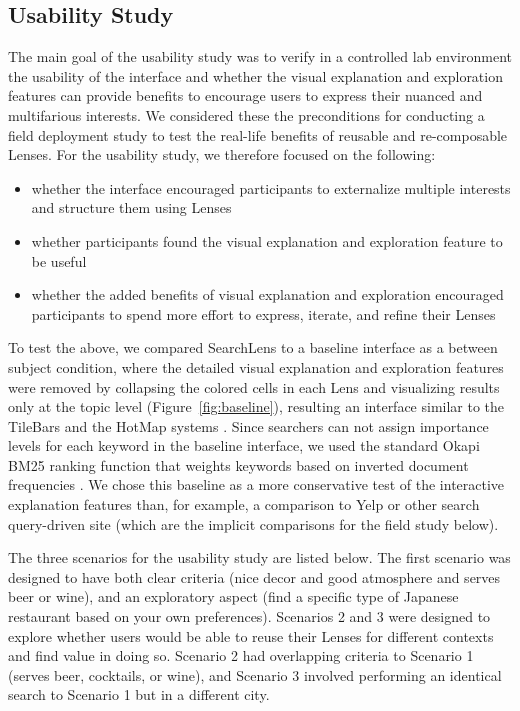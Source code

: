 \documentclass{sigchi}
\begin{document}
\subsection{Usability Study}

The main goal of the usability study was to verify in a controlled lab environment the usability of the interface and whether the visual explanation and exploration features can provide benefits to encourage users to express their nuanced and multifarious interests. We considered these the preconditions for conducting a field deployment study to test the real-life benefits of reusable and re-composable Lenses. For the usability study, we therefore focused on the following:

\begin{itemize}

    \item whether the interface encouraged participants to externalize multiple interests and structure them using Lenses
    \item whether participants found the visual explanation and exploration feature to be useful 
    \item whether the added benefits of visual explanation and exploration encouraged participants to spend more effort to express, iterate, and refine their Lenses
\end{itemize}

To test the above, we compared SearchLens to a baseline interface as a between subject condition, where the detailed visual explanation and exploration features were removed by collapsing the colored cells in each Lens and visualizing results only at the topic level (Figure~\ref{fig:baseline}), resulting an interface similar to the TileBars and the HotMap systems \cite{hearst1996visualizing, hoeber2006comparative}. Since searchers can not assign importance levels for each keyword in the baseline interface, we used the standard Okapi BM25 ranking function that weights keywords based on inverted document frequencies \cite{robertson2009probabilistic}. We chose this baseline as a more conservative test of the interactive explanation features than, for example, a comparison to Yelp or other search query-driven site (which are the implicit comparisons for the field study below).

The three scenarios for the usability study are listed below. The first scenario was designed to have both clear criteria (nice decor and good atmosphere and serves beer or wine), and an exploratory aspect (find a specific type of Japanese restaurant based on your own preferences). Scenarios 2 and 3 were designed to explore whether users would be able to reuse their Lenses for different contexts and find value in doing so. Scenario 2 had overlapping criteria to Scenario 1 (serves beer, cocktails, or wine), and Scenario 3 involved performing an identical search to Scenario 1 but in a different city.
\end{document}
